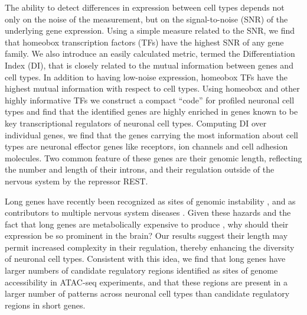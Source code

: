 The ability to detect differences in expression between cell types depends not only on the noise of the measurement, but on the signal-to-noise (SNR) of the underlying gene expression. Using a simple measure related to the SNR, we find that homeobox transcription factors (TFs) have the highest SNR of any gene family. We also introduce an easily calculated metric, termed the Differentiation Index (DI), that is closely related to the mutual information between genes and cell types. In addition to having low-noise expression, homeobox TFs have the highest mutual information with respect to cell types. Using homeobox and other highly informative TFs we construct a compact “code” for profiled neuronal cell types and find that the identified genes are highly enriched in genes known to be key transcriptional regulators of neuronal cell types.
Computing DI over individual genes, we find that the genes carrying the most information about cell types are neuronal effector genes like receptors, ion channels and cell adhesion molecules. Two common feature of these genes are their genomic length, reflecting the number and length of their introns, and their regulation outside of the nervous system by the repressor REST.

Long genes have recently been recognized as sites of genomic instability \cite{Wei_2016}, and as contributors to multiple nervous system diseases \cite{Sugino_2014, Gabel_2015, Zylka_2015}. Given these hazards and the fact that long genes are metabolically expensive to produce \cite{Castillo_Davis_2002}, why should their expression be so prominent in the brain? Our results suggest their length may permit increased complexity in their regulation, thereby enhancing the diversity of neuronal cell types. Consistent with this idea, we find that long genes have larger numbers of candidate regulatory regions identified as sites of genome accessibility in ATAC-seq experiments, and that these regions are present in a larger number of patterns across neuronal cell types than candidate regulatory regions in short genes.
